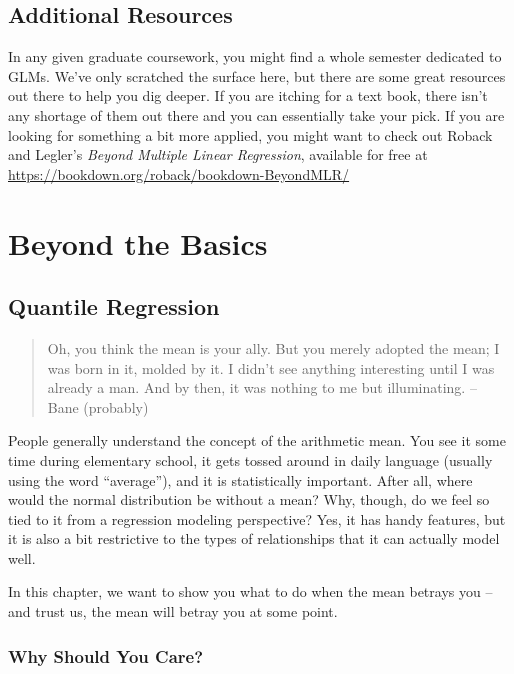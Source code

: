 \documentclass[
  letterpaper,
]{krantz}
\begin{document}
\section{Additional Resources}\label{additional-resources-1}

In any given graduate coursework, you might find a whole semester
dedicated to GLMs. We've only scratched the surface here, but there are
some great resources out there to help you dig deeper. If you are
itching for a text book, there isn't any shortage of them out there and
you can essentially take your pick. If you are looking for something a
bit more applied, you might want to check out Roback and Legler's
\emph{Beyond Multiple Linear Regression}, available for free at
\url{https://bookdown.org/roback/bookdown-BeyondMLR/}

\chapter{Beyond the Basics}\label{beyond-the-basics}

\section{Quantile Regression}\label{quantile-regression}

\begin{quote}
Oh, you think the mean is your ally. But you merely adopted the mean; I
was born in it, molded by it. I didn't see anything interesting until I
was already a man. And by then, it was nothing to me but illuminating.
-- Bane (probably)
\end{quote}

People generally understand the concept of the arithmetic mean. You see
it some time during elementary school, it gets tossed around in daily
language (usually using the word ``average''), and it is statistically
important. After all, where would the normal distribution be without a
mean? Why, though, do we feel so tied to it from a regression modeling
perspective? Yes, it has handy features, but it is also a bit
restrictive to the types of relationships that it can actually model
well.

In this chapter, we want to show you what to do when the mean betrays
you -- and trust us, the mean will betray you at some point.

\subsection{Why Should You Care?}\label{why-should-you-care-2}
\end{document}
